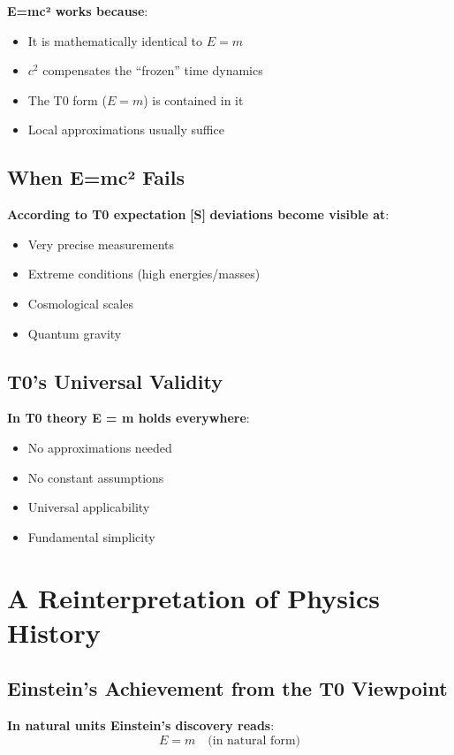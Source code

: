 	\textbf{E=mc² works because}:
	\begin{itemize}
		\item It is mathematically identical to $E = m$
		\item $c^2$ compensates the ``frozen'' time dynamics
		\item The T0 form ($E = m$) is contained in it
		\item Local approximations usually suffice
	\end{itemize}
	
	\subsection{When E=mc² Fails}
	
	\textbf{According to T0 expectation} \textbf{[S]} \textbf{deviations become visible at}:
	\begin{itemize}
		\item Very precise measurements
		\item Extreme conditions (high energies/masses)
		\item Cosmological scales
		\item Quantum gravity
	\end{itemize}
	
	\subsection{T0's Universal Validity}
	
	\textbf{In T0 theory E = m holds everywhere}:
	\begin{itemize}
		\item No approximations needed
		\item No constant assumptions
		\item Universal applicability
		\item Fundamental simplicity
	\end{itemize}
	
	\section{A Reinterpretation of Physics History}
	
	\subsection{Einstein's Achievement from the T0 Viewpoint}
	
	\textbf{In natural units Einstein's discovery reads}:
	\begin{equation}
		E = m \quad \text{(in natural form)}
	\end{equation}
	
